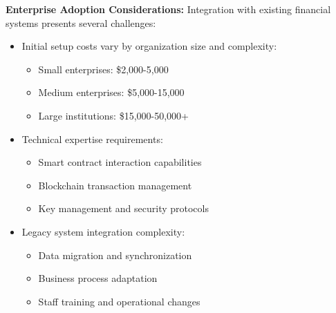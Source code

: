 \documentclass[twocolumn,10pt,a4paper]{article}
\begin{document}
\textbf{Enterprise Adoption Considerations:}
Integration with existing financial systems presents several challenges:
\begin{itemize}
    \item Initial setup costs vary by organization size and complexity:
        \begin{itemize}
            \item Small enterprises: \$2,000-5,000
            \item Medium enterprises: \$5,000-15,000
            \item Large institutions: \$15,000-50,000+
        \end{itemize}
    \item Technical expertise requirements:
        \begin{itemize}
            \item Smart contract interaction capabilities
            \item Blockchain transaction management
            \item Key management and security protocols
        \end{itemize}
    \item Legacy system integration complexity:
        \begin{itemize}
            \item Data migration and synchronization
            \item Business process adaptation
            \item Staff training and operational changes
        \end{itemize}
\end{itemize}
\end{document}
